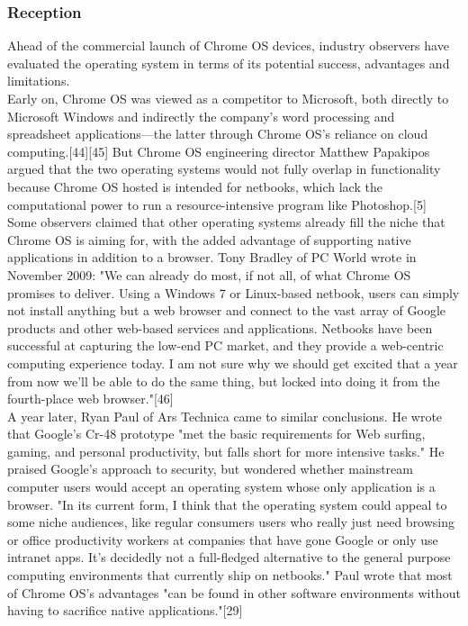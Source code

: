 \documentclass{article}
\begin{document}
			\subsubsection{Reception}

			Ahead of the commercial launch of Chrome OS devices, industry observers have evaluated the operating system in terms of its potential success, advantages and limitations.\\
			Early on, Chrome OS was viewed as a competitor to Microsoft, both directly to Microsoft Windows and indirectly the company's word processing and spreadsheet applications—the latter through Chrome OS's reliance on cloud computing.[44][45] But Chrome OS engineering director Matthew Papakipos argued that the two operating systems would not fully overlap in functionality because Chrome OS hosted is intended for netbooks, which lack the computational power to run a resource-intensive program like Photoshop.[5]\\
			Some observers claimed that other operating systems already fill the niche that Chrome OS is aiming for, with the added advantage of supporting native applications in addition to a browser. Tony Bradley of PC World wrote in November 2009: "We can already do most, if not all, of what Chrome OS promises to deliver. Using a Windows 7 or Linux-based netbook, users can simply not install anything but a web browser and connect to the vast array of Google products and other web-based services and applications. Netbooks have been successful at capturing the low-end PC market, and they provide a web-centric computing experience today. I am not sure why we should get excited that a year from now we'll be able to do the same thing, but locked into doing it from the fourth-place web browser."[46]\\
			A year later, Ryan Paul of Ars Technica came to similar conclusions. He wrote that Google's Cr-48 prototype "met the basic requirements for Web surfing, gaming, and personal productivity, but falls short for more intensive tasks." He praised Google's approach to security, but wondered whether mainstream computer users would accept an operating system whose only application is a browser. "In its current form, I think that the operating system could appeal to some niche audiences, like regular consumers users who really just need browsing or office productivity workers at companies that have gone Google or only use intranet apps. It's decidedly not a full-fledged alternative to the general purpose computing environments that currently ship on netbooks." Paul wrote that most of Chrome OS's advantages "can be found in other software environments without having to sacrifice native applications."[29]\\
\end{document}
